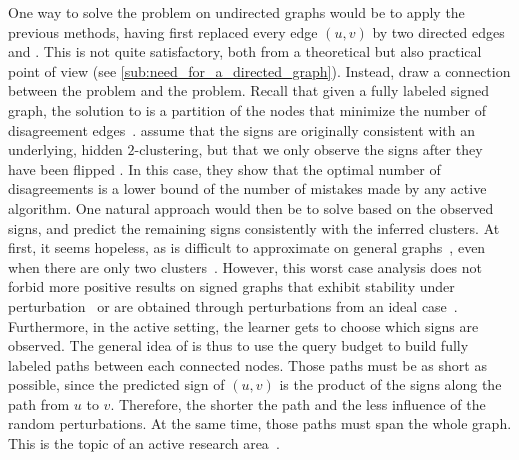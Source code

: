 One way to solve the problem on undirected graphs would be to apply the previous methods, having
first replaced every edge $(u,v)$ by two directed edges \euv{} and \evu{}. This is not quite
satisfactory, both from a theoretical but also practical point of view (see
\autoref{sub:need_for_a_directed_graph}). Instead, \textcite{Cesa-Bianchi2012b} draw a connection
between the \esp{} problem and the \pcc{} problem. Recall that given a fully labeled signed graph,
the solution to \pcc{} is a partition of the nodes that minimize the number of disagreement
edges~\autocite{Bansal2002}. \Textcite{Cesa-Bianchi2012b} assume that the signs are originally
consistent with an underlying, hidden $2$-clustering, but that we only observe the signs after they have
been flipped \uar{}. In this case, they show that the optimal number of disagreements is a lower
bound of the number of mistakes made by any active \esp{} algorithm. One natural approach would then be
to solve \pcc{} based on the observed signs, and predict the remaining signs consistently with the
inferred clusters. At first, it seems hopeless, as \pcc{} is difficult to approximate on general
graphs~\autocite{Charikar2003}, even when there are only two clusters~\autocite{Giotis2006}.
However, this worst case analysis does not forbid more positive results on signed graphs that
exhibit stability under perturbation~\autocites{clusteringFeasibility15}{StableCC09}{StableLP09} or
are obtained through perturbations from an ideal case~\autocites{plantedAilon09}{Makarychev2014}.
Furthermore, in the active setting, the learner gets to choose which signs are observed. The general
idea of \textcite{Cesa-Bianchi2012b} is thus to use the query budget to build fully labeled paths
between each connected nodes. Those paths must be as short as possible, since the predicted sign of
$(u,v)$ is the product of the signs along the path from $u$ to $v$. Therefore, the shorter the path
and the less influence of the random perturbations. At the same time, those paths must span the
whole graph. This is the topic of an active research area~\autocites{Abraham2012}{Spanner17}.

